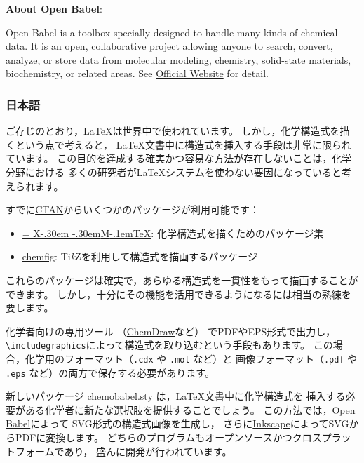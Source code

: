 \documentclass[12pt]{ltjsarticle}
\def\XyM{\ifnum\fam=-1\relax\fam=0\relax\fi\TestCount=\fam%
X\kern-.30em\smash{\raise.50ex\hbox{$\fam\TestCount\Upsilon$}}%
\kern-.30em{M}}
\def\XyMTeX{\XyM\kern-.1em\TeX}
\begin{document}
\noindent \textbf{About Open Babel}:

Open Babel is a toolbox specially designed to handle many kinds of
chemical data. It is an open, collaborative project allowing anyone to search,
convert, analyze, or store data from molecular modeling, chemistry,
solid-state materials, biochemistry, or related areas.
See \href{http://openbabel.org/}{Official Website} for detail.

\clearpage

\subsubsection{日本語}

ご存じのとおり，\LaTeX は世界中で使われています。
しかし，化学構造式を描くという点で考えると，
\LaTeX 文書中に構造式を挿入する手段は非常に限られています。
この目的を達成する確実かつ容易な方法が存在しないことは，化学分野における
多くの研究者が\LaTeX システムを使わない要因になっていると考えられます。

すでに\href{http://www.ctan.org/}{CTAN}からいくつかのパッケージが利用可能です：
\begin{itemize}
  \item \href{http://www.ctan.org/pkg/xymtex}{\XyMTeX}:
    化学構造式を描くためのパッケージ集
  \item \href{http://www.ctan.org/pkg/chemfig}{\textsf{chemfig}}:
    Ti\textit{k}Zを利用して構造式を描画するパッケージ
\end{itemize}
これらのパッケージは確実で，あらゆる構造式を一貫性をもって描画することができます。
しかし，十分にその機能を活用できるようになるには相当の熟練を要します。

化学者向けの専用ツール
（\href{http://www.cambridgesoft.com/Ensemble_for_Chemistry/ChemDraw/}{ChemDraw}など）
でPDFやEPS形式で出力し，\verb|\includegraphics|によって構造式を取り込むという手段もあります。
この場合，化学用のフォーマット（\verb|.cdx| や \verb|.mol| など）と
画像フォーマット（\verb|.pdf| や \verb|.eps| など）の両方で保存する必要があります。

新しいパッケージ \textsf{chemobabel.sty} は，\LaTeX 文書中に化学構造式を
挿入する必要がある化学者に新たな選択肢を提供することでしょう。
この方法では，\href{http://openbabel.org/}{Open Babel}によって
SVG形式の構造式画像を生成し，
さらに\href{https://inkscape.org/ja/}{Inkscape}によってSVGからPDFに変換します。
どちらのプログラムもオープンソースかつクロスプラットフォームであり，
盛んに開発が行われています。 \\
\end{document}
